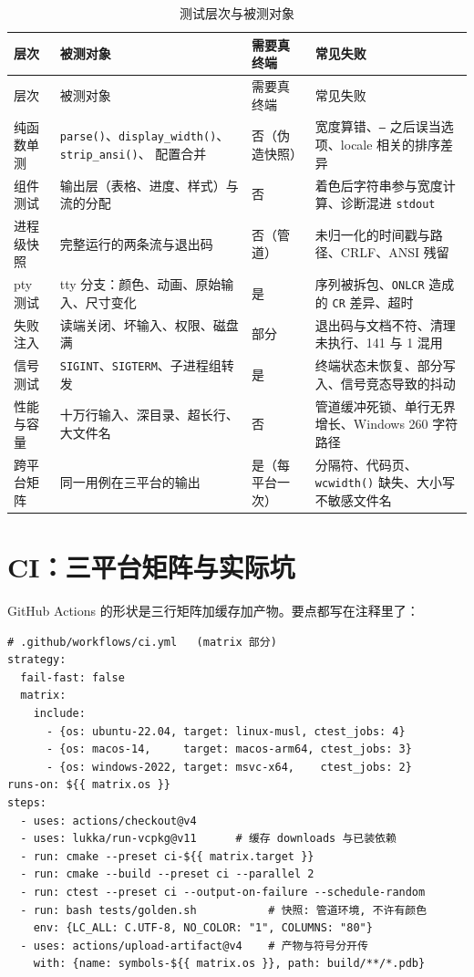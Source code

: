 \documentclass[12pt,a4paper,fontset=fandol]{ctexbook}
\newcommand{\Fn}[1]{\texttt{#1()}}
\newcommand{\Tp}[1]{\texttt{#1}}
\begin{document}
\begin{longtable}{@{}>{\raggedright\arraybackslash}p{}
                 >{\raggedright\arraybackslash}p{}
                 >{\raggedright\arraybackslash}p{}
                 >{\raggedright\arraybackslash}p{}@{}}
\caption{测试层次与被测对象}
\label{tab:testlevels} \\
\toprule
层次 & 被测对象 & 需要真终端 & 常见失败 \\
\midrule
\endfirsthead
\toprule
层次 & 被测对象 & 需要真终端 & 常见失败 \\
\midrule
\endhead
纯函数单测 & \Fn{parse}、\Fn{display\_width}、\Fn{strip\_ansi}、
配置合并 & 否（伪造快照） &
宽度算错、\Tp{--} 之后误当选项、locale 相关的排序差异 \\
组件测试 & 输出层（表格、进度、样式）与流的分配 & 否 &
着色后字符串参与宽度计算、诊断混进 \Tp{stdout} \\
进程级快照 & 完整运行的两条流与退出码 & 否（管道） &
未归一化的时间戳与路径、CRLF、ANSI 残留 \\
pty 测试 & tty 分支：颜色、动画、原始输入、尺寸变化 & 是 &
序列被拆包、\Tp{ONLCR} 造成的 \Tp{CR} 差异、超时 \\
失败注入 & 读端关闭、坏输入、权限、磁盘满 & 部分 &
退出码与文档不符、清理未执行、141 与 1 混用 \\
信号测试 & \Tp{SIGINT}、\Tp{SIGTERM}、子进程组转发 & 是 &
终端状态未恢复、部分写入、信号竞态导致的抖动 \\
性能与容量 & 十万行输入、深目录、超长行、大文件名 & 否 &
管道缓冲死锁、单行无界增长、Windows 260 字符路径 \\
跨平台矩阵 & 同一用例在三平台的输出 & 是（每平台一次） &
分隔符、代码页、\Fn{wcwidth} 缺失、大小写不敏感文件名 \\
\bottomrule
\end{longtable}

\section{CI：三平台矩阵与实际坑}

GitHub Actions 的形状是三行矩阵加缓存加产物。要点都写在注释里了：

\begin{lstlisting}[style=shellstyle,caption={CI 矩阵作业（YAML 节选）}]
# .github/workflows/ci.yml   (matrix 部分)
strategy:
  fail-fast: false
  matrix:
    include:
      - {os: ubuntu-22.04, target: linux-musl, ctest_jobs: 4}
      - {os: macos-14,     target: macos-arm64, ctest_jobs: 3}
      - {os: windows-2022, target: msvc-x64,    ctest_jobs: 2}
runs-on: ${{ matrix.os }}
steps:
  - uses: actions/checkout@v4
  - uses: lukka/run-vcpkg@v11      # 缓存 downloads 与已装依赖
  - run: cmake --preset ci-${{ matrix.target }}
  - run: cmake --build --preset ci --parallel 2
  - run: ctest --preset ci --output-on-failure --schedule-random
  - run: bash tests/golden.sh           # 快照: 管道环境, 不许有颜色
    env: {LC_ALL: C.UTF-8, NO_COLOR: "1", COLUMNS: "80"}
  - uses: actions/upload-artifact@v4    # 产物与符号分开传
    with: {name: symbols-${{ matrix.os }}, path: build/**/*.pdb}
\end{lstlisting}
\end{document}
